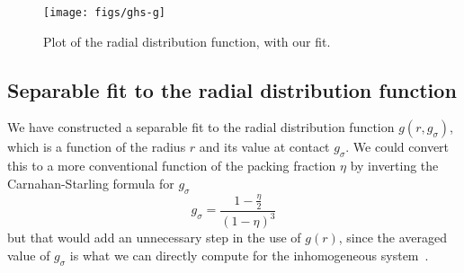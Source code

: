 \documentclass[letterpaper,twocolumn,amsmath,amssymb,pre,aps,10pt]{revtex4-1}
\begin{document}
\begin{figure}
  \centering
  \texttt{[image: figs/ghs-g]}%
  \caption{Plot of the radial distribution function, with our fit.}\label{fig:radial-distribution}
\end{figure}
\subsection{Separable fit to the radial distribution function}

We have constructed a separable fit to the radial distribution
function $g(r, g_\sigma)$, which is a function of the radius $r$ and
its value at contact $g_\sigma$.  We could convert this to a more
conventional function of the packing fraction $\eta$ by inverting the
Carnahan-Starling formula for $g_\sigma$
\begin{equation}
  g_\sigma = \frac{1-\tfrac{\eta}{2}}{(1-\eta)^3}
\end{equation}
but that would add an unnecessary step in the use of $g(r)$, since the
averaged value of $g_\sigma$ is what we can directly compute for the
inhomogeneous system~\cite{schulte2012using}.
\end{document}
